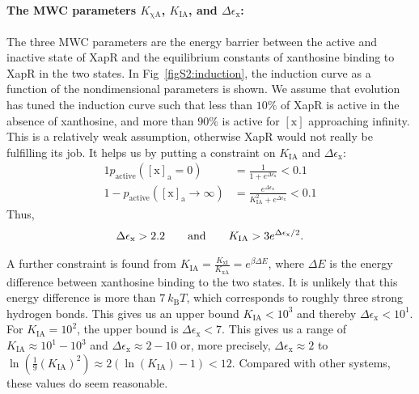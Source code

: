 \documentclass[10pt,letterpaper]{article}
\newcommand{\n}[1]{\mathrm{#1}}
\begin{document}
\paragraph*{The MWC parameters $K_{\n{\chi A}}$, $K_{\n{IA}}$, and $\Delta \epsilon_{\n{x}}$:}
The three MWC parameters are the energy barrier between the active and inactive state of XapR and the equilibrium constants of xanthosine binding to XapR in the two states. 
In Fig~\ref{figS2:induction}, the induction curve as a function of the nondimensional parameters is shown. We assume that evolution has tuned the induction curve such that less than $10 \%$ of XapR is active in the absence of xanthosine, and more than $90 \%$ is active for $\n{[x]}$ approaching infinity. This is a relatively weak assumption, otherwise XapR would not really be fulfilling its job. It helps us by putting a constraint on $K_{\n{IA}}$ and $\Delta \epsilon_{\n{x}}$:
\begin{alignat*}{1}
p_{\n{active}}(\n{[x]_a} = 0) &= \frac{1}{1 + e^{\Delta \epsilon_{\n{x}}}} < 0.1 \\
1-p_{\n{active}}(\n{[x]_a} \to \infty) &= \frac{e^{\Delta \epsilon_{\n{x}}}}{K_{\n{IA}}^2 + e^{\Delta \epsilon_{\n{x}}}} < 0.1
\end{alignat*}
Thus, 
\begin{eqnarray*}
	\Delta \epsilon_{\n{x}} > 2.2 \hspace{2 em} \n{and} \hspace{2 em} K_{\n{IA}} > 3 e^{\Delta \epsilon_{\n{x}} / 2}.
\end{eqnarray*}

A further constraint is found from $K_{\n{IA}}=\frac{K_{\n{x I}}}{K_{\n{x A}}} = e^{\beta \Delta E}$, where $\Delta E$ is the energy difference between xanthosine binding to the two states. It is unlikely that this energy difference is more than $7~k_{\n{B}} T$, which corresponds to roughly three strong hydrogen bonds. This gives us an upper bound $K_{\n{IA}} < 10^3$ and thereby $\Delta \epsilon_{\n{x}} < 10^1$. For $K_{\n{IA}} = 10^2$, the upper bound is $\Delta \epsilon_{\n{x}} < 7$. This gives us a range of $K_{\n{IA}} \approx 10^1 - 10^3$ and $\Delta \epsilon_{\n{x}} \approx 2 - 10$ or, more precisely, $\Delta \epsilon_{\n{x}} \approx 2$ to $\ln\left(\frac{1}{9} \left(K_{\n{IA}}\right)^2 \right) \approx 2 \left( \ln\left(K_{\n{IA}}\right) - 1\right) < 12$. Compared with other systems, these values do seem reasonable. 
\end{document}
